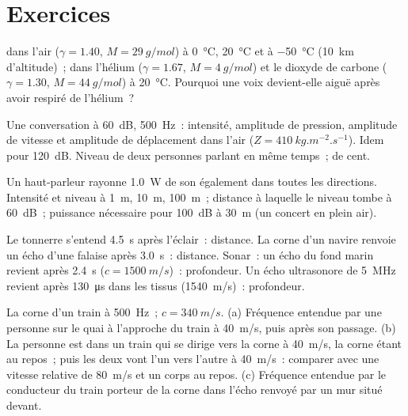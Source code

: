 \section{Exercices}

\begin{exercise}[$\star$]\label{exo:b2:sound-waves:1}
 dans l'air ($\gamma = 1.40$, $M = \qty{29}{g/mol}$) à
\qty{0}{\degreeCelsius}, \qty{20}{\degreeCelsius} et à \qty{-50}{\degreeCelsius}
(\qty{10}{km} d'altitude)~; dans l'hélium ($\gamma = 1.67$, $M = \qty{4}{g/mol}$) et
le dioxyde de carbone ($\gamma = 1.30$, $M = \qty{44}{g/mol}$) à \qty{20}{\degreeCelsius}.
Pourquoi une voix devient-elle aiguë après avoir respiré de l'hélium~?
\end{exercise}

\begin{exercise}[$\star$]\label{exo:b2:sound-waves:2}
Une conversation à \qty{60}{dB}, \qty{500}{Hz}~: intensité, amplitude de
pression, amplitude de vitesse et amplitude de déplacement dans l'air
($Z = \qty{410}{kg.m^{-2}.s^{-1}}$). Idem pour \qty{120}{dB}. Niveau de deux
personnes parlant en même temps~; de cent.
\end{exercise}

\begin{exercise}[$\star$]\label{exo:b2:sound-waves:3}
Un haut-parleur rayonne \qty{1.0}{W} de son également dans toutes les directions.
Intensité et niveau à \qty{1}{m}, \qty{10}{m}, \qty{100}{m}~; distance à laquelle
le niveau tombe à \qty{60}{dB}~; puissance nécessaire pour \qty{100}{dB} à \qty{30}{m}
(un concert en plein air).
\end{exercise}

\begin{exercise}[$\star$]\label{exo:b2:sound-waves:4}
Le tonnerre s'entend \qty{4.5}{s} après l'éclair~: distance. La corne d'un navire
renvoie un écho d'une falaise après \qty{3.0}{s}~: distance. Sonar~: un écho du
fond marin revient après \qty{2.4}{s} ($c = \qty{1500}{m/s}$)~: profondeur. Un
écho ultrasonore de \qty{5}{MHz} revient après \qty{130}{\micro s} dans les tissus
(\qty{1540}{m/s})~: profondeur.
\end{exercise}

\begin{exercise}[$\star\star$]\label{exo:b2:sound-waves:5}
La corne d'un train à \qty{500}{Hz}~; $c = \qty{340}{m/s}$. (a) Fréquence entendue par une
personne sur le quai à l'approche du train à \qty{40}{m/s}, puis
après son passage. (b) La personne est dans un train qui se dirige vers la
corne à \qty{40}{m/s}, la corne étant au repos~; puis les deux vont l'un vers
l'autre à \qty{40}{m/s}~: comparer avec une vitesse relative de \qty{80}{m/s} et
un corps au repos. (c) Fréquence entendue par le conducteur du train porteur de la corne
dans l'écho renvoyé par un mur situé devant.
\end{exercise}

